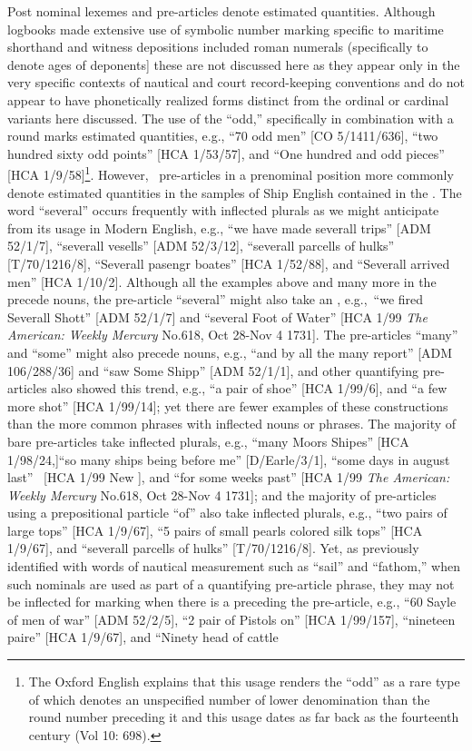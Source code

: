 Post nominal lexemes and  pre-articles denote estimated quantities. Although logbooks made extensive use of symbolic number marking specific to maritime shorthand and witness depositions included roman numerals (specifically to denote ages of deponents] these are not discussed here as they appear only in the very specific contexts of nautical and court record-keeping conventions and do not appear to have phonetically realized forms distinct from the ordinal or cardinal variants here discussed.  The use of the  “odd,” specifically in combination with a round  marks estimated quantities, e.g., “70 odd men” [CO 5/1411/636], “two hundred sixty odd points” [HCA 1/53/57], and “One hundred and odd pieces” [HCA 1/9/58]\footnote{The Oxford English \citet{Dictionary1989} explains that this usage renders the  “odd” as a rare type of   which denotes an unspecified number of lower denomination than the round number preceding it and this usage dates as far back as the fourteenth century (Vol 10: 698).}.  However,~ pre-articles in a prenominal position more commonly denote estimated quantities in the samples of Ship English contained in the . The word “several” occurs frequently with inflected plurals as we might anticipate from its usage in Modern English, e.g., “we have made severall trips” [ADM 52/1/7], “severall vesells” [ADM 52/3/12], “severall parcells of hulks” [T/70/1216/8], “Severall pasengr boates” [HCA 1/52/88], and “Severall arrived men” [HCA 1/10/2]. Although all the examples above and many more in the  precede  nouns, the pre-article “several” might also take an  , e.g.,~“we fired Severall Shott” [ADM 52/1/7] and “several Foot of Water” [HCA 1/99 \textit{The American: Weekly Mercury} No.618, Oct 28-Nov 4 1731]. The pre-articles “many” and “some” might also precede  nouns, e.g., “and by all the many report” [ADM 106/288/36] and “saw Some Shipp” [ADM 52/1/1], and other quantifying pre-articles also showed this trend, e.g., “a pair of shoe” [HCA 1/99/6], and “a few more shot” [HCA 1/99/14]; yet there are fewer examples of these constructions than the more common phrases with inflected nouns or  phrases. The majority of bare pre-articles take inflected plurals, e.g., “many Moors Shipes” [HCA 1/98/24,]“so many ships being before me” [D/Earle/3/1], “some days in august last” ~[HCA 1/99 New \citealt{Providence1722}], and “for some weeks past” [HCA 1/99 \textit{The American: Weekly Mercury} No.618, Oct 28-Nov 4 1731]; and the majority of pre-articles using a prepositional particle “of” also take inflected plurals, e.g., “two pairs of large tops” [HCA 1/9/67], “5 pairs of small pearls colored silk tops” [HCA 1/9/67], and “severall parcells of hulks” [T/70/1216/8]. Yet, as previously identified with words of nautical measurement such as “sail” and “fathom,” when such nominals are used as part of a quantifying pre-article phrase, they may not be inflected for  marking when there is a  preceding the pre-article, e.g., “60 Sayle of men of war” [ADM 52/2/5], “2 pair of Pistols on” [HCA 1/99/157], “nineteen paire” [HCA 1/9/67], and “Ninety head of cattle 